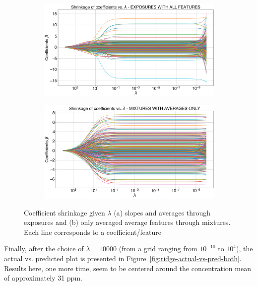 \begin{figure}[!htb]
	\centering
	
	\begin{subfigure}[t]{0.6\textwidth}
		\includegraphics[width=1\linewidth]{../figures/ridge-shrink.png}
		\caption{}
		\label{fig:ridge-shrink} 
	\end{subfigure}
	
	\begin{subfigure}[t]{0.6\textwidth}
		\includegraphics[width=1\linewidth]{../figures/ridge-shrink-avg-feat.png}
		\caption{}
		\label{fig:ridge-shrink-avg-feat}
	\end{subfigure}
	
	\caption{Coefficient shrinkage given $\lambda$ (a) slopes and averages through exposures and (b) only averaged average features through mixtures. Each line corresponds to a coefficient/feature}

	\label{fig:ridge-shrink-both}
\end{figure}

\clearpage
Finally, after the choice of $\lambda = 10000$ (from a grid ranging from $10^{-10}$ to $10^4$), the actual vs. predicted plot is presented in Figure~\ref{fig:ridge-actual-vs-pred-both}. Results here, one more time, seem to be centered around the concentration mean of approximately 31 \acrshort{ppm}.

